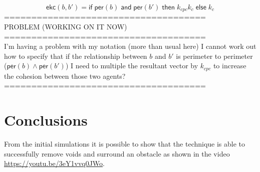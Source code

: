 \documentclass[12pt,a4paper]{article}
\begin{document}
\begin{equation}\label{eq:cohesion3}
\mathsf{ekc}(b, b') = \mathsf{if} \; \mathsf{per}(b) \; \mathsf{and} \; \mathsf{per}(b') \; \mathsf{then} \; k_{cpc}k_c \; \mathsf{else} \; k_c
\end{equation}
=====================================\\
PROBLEM (WORKING ON IT NOW)\\
=====================================\\
I'm having a problem with my notation (more than usual here) I cannot work out how to specify that if the relationship between $b$ and $b'$ is perimeter to perimeter ($\mathsf{per}(b)\wedge \mathsf{per}(b')$) I need to multiple the resultant vector by $k_{cpc}$ to increase the cohesion between those two agents?\\ 
=====================================\\

\section{Conclusions}\label{conclusions}
From the initial simulations it is possible to show that the technique is able to successfully remove voids and surround an obstacle as shown in the video \href{https://youtu.be/3eY1vvq0JWo}{https://youtu.be/3eY1vvq0JWo}.



\end{document}
